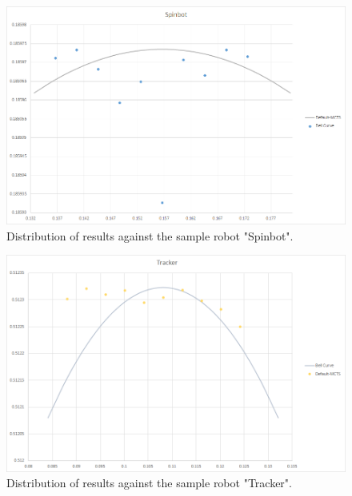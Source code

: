 \begin{figure}[htp]
\centerline{\includegraphics[width=\columnwidth]{Images/SpinbotDistribution}}
\caption{Distribution of results against the sample robot "Spinbot".}
\label{figure--Distribution-Spinbot}
\end{figure}

\begin{figure}[htp]
\centerline{\includegraphics[width=\columnwidth]{Images/TrackerDistribution}}
\caption{Distribution of results against the sample robot "Tracker".}
\label{figure--Distribution-Tracker}
\end{figure}

